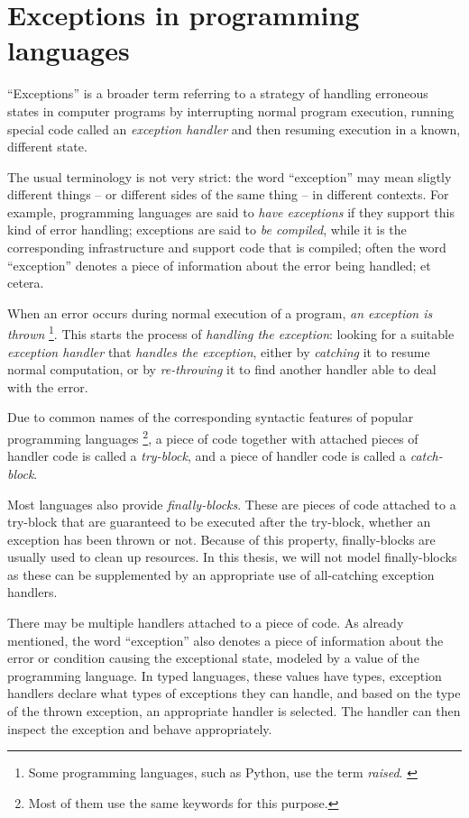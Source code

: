 \chapter{Exceptions in programming languages}

``Exceptions'' is a broader term referring to a strategy of handling erroneous
states in computer programs by interrupting normal program execution, running special
code called an \emph{exception handler} and then resuming execution in a known, different
state.

The usual terminology is not very strict: the word ``exception'' may mean sligtly
different things -- or different sides of the same thing -- in different contexts.
For example, programming languages are said to \emph{have exceptions} if they support
this kind of error handling; exceptions are said to \emph{be compiled}, while it is the
corresponding infrastructure and support code that is compiled; often the word ``exception''
denotes a piece of information about the error being handled; et cetera.

When an error occurs during normal execution of a program, \emph{an exception is thrown}%
\footnote{Some programming languages, such as Python, use the term \emph{raised}.%
\cite{python:reference}}.
This starts the
process of \emph{handling the exception}: looking for a suitable
\emph{exception handler} that \emph{handles the exception}, either by \emph{catching} it
to resume normal computation, or by \emph{re-throwing} it to find another handler
able to deal with the error.

Due to common names of the corresponding syntactic features of popular programming languages%
\footnote{Most of them use the same keywords for this purpose.},
a piece of code together with attached pieces of handler code is called a \emph{try-block},
and a piece of handler code is called a \emph{catch-block}.

Most languages also provide \emph{finally-blocks}. These are pieces of code attached to a
try-block that are guaranteed to be executed after the try-block, whether an exception
has been thrown or not. Because of this property, finally-blocks are usually used to clean up
resources. In this thesis, we will not model finally-blocks as these can be
supplemented by an appropriate use of all-catching exception handlers.

There may be multiple handlers attached to a piece of code.
As already mentioned, the word ``exception'' also denotes a piece of information about
the error or condition causing the exceptional state, modeled by a value of the programming
language. In typed languages, these values have types, exception handlers declare what
types of exceptions they can handle, and based on the type of the thrown exception,
an appropriate handler is selected. The handler can then inspect the exception and
behave appropriately.

